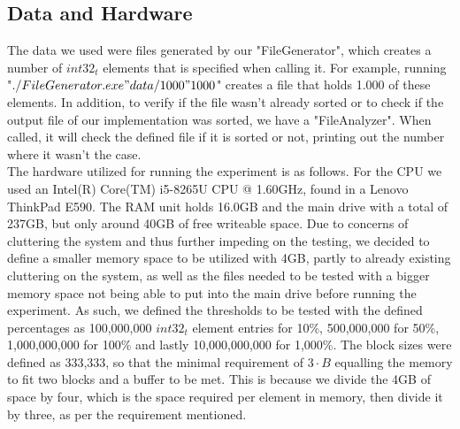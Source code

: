 \documentclass[twocolumn]{article}
\begin{document}
\subsection{Data and Hardware}%
\label{sub:Data and Hardware}
The data we used were files generated by our "FileGenerator", which creates a number of $int32_t$ elements that is specified when calling it. For example, running "$./FileGenerator.exe "data/1000" 1000$" creates a file that holds 1.000 of these elements. In addition, to verify if the file wasn't already sorted or to check if the output file of our implementation was sorted, we have a "FileAnalyzer". When called, it will check the defined file if it is sorted or not, printing out the number where it wasn't the case.\\
The hardware utilized for running the experiment is as follows. For the CPU we used an Intel(R) Core(TM) i5-8265U CPU @ 1.60GHz, found in a Lenovo ThinkPad E590. The RAM unit holds 16.0GB and the main drive with a total of 237GB, but only around 40GB of free writeable space. Due to concerns of cluttering the system and thus further impeding on the testing, we decided to define a smaller memory space to be utilized with 4GB, partly to already existing cluttering on the system, as well as the files needed to be tested with a bigger memory space not being able to put into the main drive before running the experiment.
As such, we defined the thresholds to be tested with the defined percentages as 100,000,000 $int32_t$ element entries for 10\%, 500,000,000 for 50\%, 1,000,000,000 for 100\% and lastly 10,000,000,000 for 1,000\%. The block sizes were defined as 333,333, so that the minimal requirement of $3 \cdot B$ equalling the memory to fit two blocks and a buffer to be met. This is because we divide the 4GB of space by four, which is the space required per element in memory, then divide it by three, as per the requirement mentioned.
\end{document}
